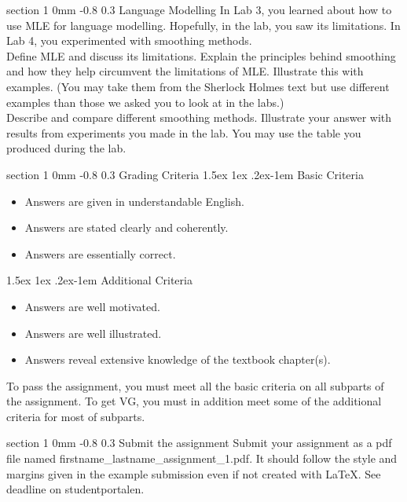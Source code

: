 \documentclass[11pt]{article}
\makeatletter
\newenvironment{titlemize}[1]{%
    \paragraph{#1}
    \begin{itemize}
        \setlength\itemsep{0pt}}
    {\end{itemize}}
\renewcommand{\section}{\@startsection
{section}%
{1}%
{0mm}%
{-0.8\baselineskip}%
{0.3\baselineskip}%
{\bfseries\large}}%
\renewcommand{\paragraph}{%
  \@startsection{paragraph}{4}%
  {\z@}{1.5ex \@plus 1ex \@minus .2ex}{-1em}%
  {\normalfont\normalsize\bfseries}%
}\makeatother
\makeatother
\begin{document}
\section{Language Modelling}
\indent In Lab 3, you learned about how to use MLE for language modelling.
Hopefully, in the lab, you saw its limitations. 
In Lab 4, you experimented with smoothing methods.\\
\indent Define MLE and discuss its limitations. Explain the principles behind
smoothing and how they help circumvent the limitations of MLE. Illustrate this
with examples. (You may take them from the Sherlock Holmes text but use
different examples than those we asked you to look at in the labs.)\\
\indent Describe and compare different smoothing methods.  Illustrate your
answer with results from experiments you made in the lab. You may use the table
you produced during the lab.

\section{Grading Criteria}
\begin{titlemize}{Basic Criteria}
\item Answers are given in understandable English.
\item Answers are stated clearly and coherently.
\item Answers are essentially correct.
\end{titlemize}
\begin{titlemize}{Additional Criteria}
\item Answers are well motivated.
\item Answers are well illustrated.
\item Answers reveal extensive knowledge of the textbook chapter(s).
\end{titlemize}
To pass the assignment, you must meet all the basic criteria on all
subparts of the assignment.  To get VG, you must in addition meet some
of the additional criteria for most of subparts.


\section{Submit the assignment}
\noindent
Submit your assignment as a pdf file named
firstname\_lastname\_assignment\_1.pdf. It should follow the style and
margins given in the example submission even if not created with
LaTeX. See deadline on studentportalen.
\end{document}
